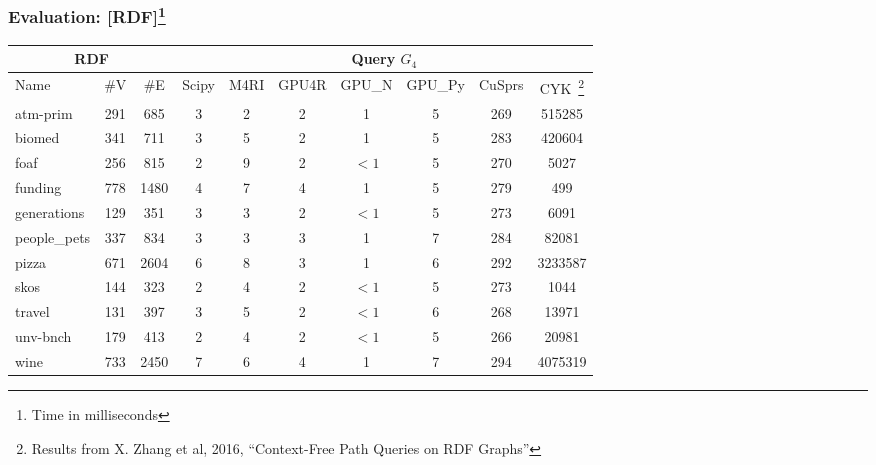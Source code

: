 \documentclass[xcolor=table]{beamer}
\newcommand{\ltz}{$< 1$}
\begin{document}
\begin{frame}[fragile] \frametitle{Evaluation: [RDF]\footnote{Time in milliseconds}}
\begin{center}
  {\tiny
  \begin{tabular}{| p{1.25cm} | c | c | c | c | c | c | c | c | c |}
      \hline
      \multicolumn{3}{|c|}{RDF}        & \multicolumn{7}{|c|}{Query $G_4$}  \\
      \hline
      Name                                & \#V & \#E  & Scipy & M4RI  & GPU4R & GPU\_N & GPU\_Py & CuSprs & CYK~\footnote{Results from X. Zhang et al, 2016, ``Context-Free Path Queries on RDF Graphs''} \\
      \hline
      \hline
      \tiny{atm-prim}                    & 291 & 685  & 3     &  2    & 2     & 1      & 5       & 269  & 515285  \\
      \tiny{biomed}                      & 341 & 711  & 3     &  5    & 2     & 1      & 5       & 283  & 420604  \\
      \tiny{foaf}                        & 256 & 815  & 2     &  9    & 2     & \ltz   & 5       & 270  & 5027    \\
      \tiny{funding}                     & 778 & 1480 & 4     &  7    & 4     & 1      & 5       & 279  & 499     \\
      \tiny{generations}                 & 129 & 351  & 3     &  3    & 2     & \ltz   & 5       & 273  & 6091    \\
      \tiny{people\_pets}                & 337 & 834  & 3     &  3    & 3     & 1      & 7       & 284  & 82081   \\
      \tiny{pizza}                       & 671 & 2604 & 6     &  8    & 3     & 1      & 6       & 292  & 3233587 \\
      \tiny{skos}                        & 144 & 323  & 2     &  4    & 2     & \ltz   & 5       & 273  & 1044    \\
      \tiny{travel}                      & 131 & 397  & 3     &  5    & 2     & \ltz   & 6       & 268  & 13971   \\
      \tiny{unv-bnch}                    & 179 & 413  & 2     &  4    & 2     & \ltz   & 5       & 266  & 20981   \\
      \tiny{wine}                        & 733 & 2450 & 7     &  6    & 4     & 1      & 7       & 294  & 4075319 \\
      \hline
    \end{tabular}
    }
 \end{center}

\end{frame}
\end{document}
